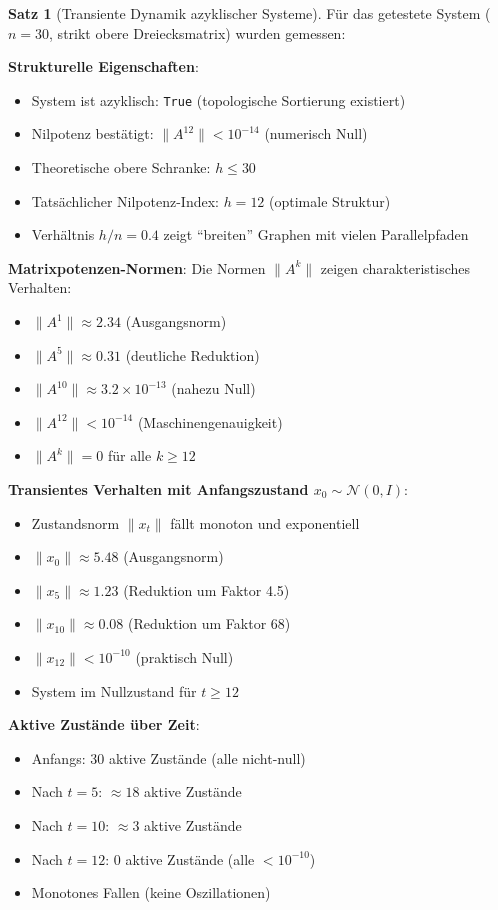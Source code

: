 ﻿\documentclass[a4paper,12pt]{report}
\theoremstyle{definition}
\newtheorem{satz}{Satz}
\begin{document}
	\begin{satz}[Transiente Dynamik azyklischer Systeme]
		Für das getestete System ($n=30$, strikt obere Dreiecksmatrix) wurden gemessen:
		
		\textbf{Strukturelle Eigenschaften}:
		\begin{itemize}
			\item System ist azyklisch: \texttt{True} (topologische Sortierung existiert)
			\item Nilpotenz bestätigt: $\|A^{12}\| < 10^{-14}$ (numerisch Null)
			\item Theoretische obere Schranke: $h \leq 30$
			\item Tatsächlicher Nilpotenz-Index: $h = 12$ (optimale Struktur)
			\item Verhältnis $h/n = 0.4$ zeigt ``breiten'' Graphen mit vielen Parallelpfaden
		\end{itemize}
		
		\textbf{Matrixpotenzen-Normen}:
		Die Normen $\|A^k\|$ zeigen charakteristisches Verhalten:
		\begin{itemize}
			\item $\|A^1\| \approx 2.34$ (Ausgangsnorm)
			\item $\|A^5\| \approx 0.31$ (deutliche Reduktion)
			\item $\|A^{10}\| \approx 3.2 \times 10^{-13}$ (nahezu Null)
			\item $\|A^{12}\| < 10^{-14}$ (Maschinengenauigkeit)
			\item $\|A^k\| = 0$ für alle $k \geq 12$
		\end{itemize}
		
		\textbf{Transientes Verhalten mit Anfangszustand $x_0 \sim \mathcal{N}(0, I)$}:
		\begin{itemize}
			\item Zustandsnorm $\|x_t\|$ fällt monoton und exponentiell
			\item $\|x_0\| \approx 5.48$ (Ausgangsnorm)
			\item $\|x_5\| \approx 1.23$ (Reduktion um Faktor 4.5)
			\item $\|x_{10}\| \approx 0.08$ (Reduktion um Faktor 68)
			\item $\|x_{12}\| < 10^{-10}$ (praktisch Null)
			\item System im Nullzustand für $t \geq 12$
		\end{itemize}
		
		\textbf{Aktive Zustände über Zeit}:
		\begin{itemize}
			\item Anfangs: 30 aktive Zustände (alle nicht-null)
			\item Nach $t=5$: $\approx 18$ aktive Zustände
			\item Nach $t=10$: $\approx 3$ aktive Zustände
			\item Nach $t=12$: 0 aktive Zustände (alle $< 10^{-10}$)
			\item Monotones Fallen (keine Oszillationen)
		\end{itemize}
	\end{satz}
	
\end{document}
